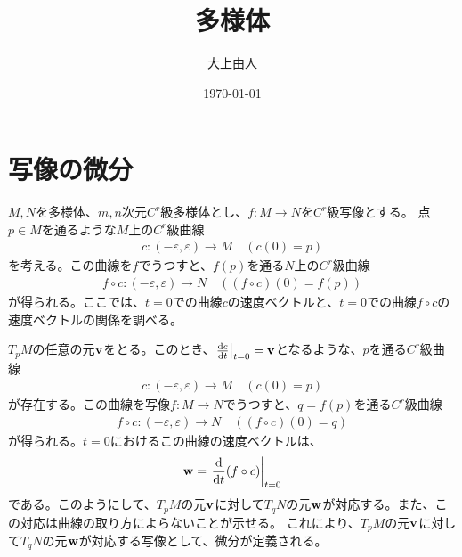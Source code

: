 \documentclass[a4paper,11pt]{jsarticle}
\numberwithin{equation}{section}
\begin{document}
\title{多様体}
\author{大上由人}
\date{\today}
\maketitle

\section{写像の微分}
$M,N$を多様体、$m,n$次元$C^r$級多様体とし、$f: M \to N$を$C^r$級写像とする。
点$p \in M$を通るような$M$上の$C^r$級曲線
\begin{align}
    c: (-\varepsilon, \varepsilon) \to M \quad (c(0) = p)
\end{align}
を考える。この曲線を$f$でうつすと、$f(p)$を通る$N$上の$C^r$級曲線
\begin{align}
    f \circ c: (-\varepsilon, \varepsilon) \to N \quad ((f \circ c)(0) = f(p))
\end{align}
が得られる。ここでは、$t=0$での曲線$c$の速度ベクトルと、$t=0$での曲線$f \circ c$の速度ベクトルの関係を調べる。

$T_pM$の任意の元$\vb{v}$をとる。このとき、$\left.\dv{c}{t}\right|_{t=0} = \vb{v}$となるような、$p$を通る$C^r$級曲線
\begin{align}
    c: (-\varepsilon, \varepsilon) \to M \quad (c(0) = p)
\end{align}
が存在する。この曲線を写像$f: M \to N$でうつすと、$q = f(p)$を通る$C^r$級曲線
\begin{align}
    f \circ c: (-\varepsilon, \varepsilon) \to N \quad ((f \circ c)(0) = q)
\end{align}
が得られる。$t=0$におけるこの曲線の速度ベクトルは、
\begin{align}
    \vb{w} = \left.\dv{t} (f \circ c)\right|_{t=0}
\end{align}
である。このようにして、$T_pM$の元$\vb{v}$に対して$T_qN$の元$\vb{w}$が対応する。また、この対応は曲線の取り方によらないことが示せる。
これにより、$T_pM$の元$\vb{v}$に対して$T_qN$の元$\vb{w}$が対応する写像として、微分が定義される。
\end{document}
